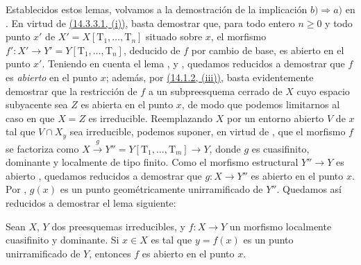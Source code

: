 Establecidos estos lemas, volvamos a la demostración de la implicación $b)\Rightarrow a)$ en .
En virtud de {\hyperlink{ega4.c04.subsec.14-3-3-1}{(14.3.3.1, (i))}}, basta demostrar que, para todo entero $n\geq 0$ y todo punto $x'$ de $X'=X[\mathrm{T}_1,\ldots,\mathrm{T}_n]$ situado sobre $x$, el morfismo
$f':X'\to Y'=Y[\mathrm{T}_1,\ldots,\mathrm{T}_n]$, deducido de $f$ por cambio de base, es abierto en el punto $x'$.
Teniendo en cuenta el lema ,  y , quedamos reducidos a demostrar que $f$ es \emph{abierto} en el punto $x$; además, por {\hyperlink{ega4.c04.prop.14-1-2}{(14.1.2, (iii))}}, basta evidentemente demostrar que la restricción de $f$ a un subpreesquema cerrado de $X$ cuyo espacio subyacente sea $Z$ es abierta en el punto $x$, de modo que podemos limitarnos al caso en que $X=Z$ es irreducible.
Reemplazando $X$ por un entorno abierto $V$ de $x$ tal que $V\cap X_y$ sea irreducible, podemos suponer, en virtud de , que el morfismo $f$ se factoriza como $X\xrightarrow{g}Y''=Y[\mathrm{T}_1,\ldots,\mathrm{T}_m]\to Y$, donde $g$ es cuasifinito, dominante y localmente de tipo finito.
Como el morfismo estructural $Y''\to Y$ es abierto , quedamos reducidos a demostrar que $g:X\to Y''$ es abierto en el punto $x$.
Por , $g(x)$ es un punto geométricamente unirramificado de $Y''$.
Quedamos así reducidos a demostrar el lema siguiente:

\begin{lemma}[14.4.1.3]
\label{IV.14.4.1.3}
Sean $X$, $Y$ dos preesquemas irreducibles, y $f:X\to Y$ un morfismo localmente cuasifinito y dominante.
Si $x\in X$ es tal que $y=f(x)$ es un punto unirramificado de $Y$, entonces $f$ es abierto en el punto $x$.
\end{lemma}

